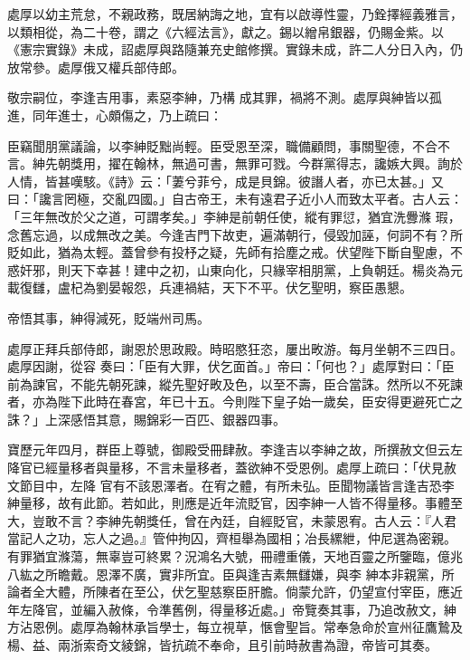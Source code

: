 \begin{pinyinscope}
 處厚以幼主荒怠，不親政務，既居納誨之地，宜有以啟導性靈，乃銓擇經義雅言，以類相從，為二十卷，謂之《六經法言》，獻之。錫以繒帛銀器，仍賜金紫。以《憲宗實錄》未成，詔處厚與路隨兼充史館修撰。實錄未成，許二人分日入內，仍放常參。處厚俄又權兵部侍郎。



 敬宗嗣位，李逢吉用事，素惡李紳，乃構
 成其罪，禍將不測。處厚與紳皆以孤進，同年進士，心頗傷之，乃上疏曰：



 臣竊聞朋黨議論，以李紳貶黜尚輕。臣受恩至深，職備顧問，事關聖德，不合不言。紳先朝獎用，擢在翰林，無過可書，無罪可戮。今群黨得志，讒嫉大興。詢於人情，皆甚嘆駭。《詩》云：「萋兮菲兮，成是貝錦。彼譖人者，亦已太甚。」又曰：「讒言罔極，交亂四國。」自古帝王，未有遠君子近小人而致太平者。古人云：「三年無改於父之道，可謂孝矣。」李紳是前朝任使，縱有罪愆，猶宜洗釁滌
 瑕，念舊忘過，以成無改之美。今逢吉門下故吏，遍滿朝行，侵毀加誣，何詞不有？所貶如此，猶為太輕。蓋曾參有投杼之疑，先師有拾塵之戒。伏望陛下斷自聖慮，不惑奸邪，則天下幸甚！建中之初，山東向化，只緣宰相朋黨，上負朝廷。楊炎為元載復讎，盧杞為劉晏報怨，兵連禍結，天下不平。伏乞聖明，察臣愚懇。



 帝悟其事，紳得減死，貶端州司馬。



 處厚正拜兵部侍郎，謝恩於思政殿。時昭愍狂恣，屢出畋游。每月坐朝不三四日。處厚因謝，從容
 奏曰：「臣有大罪，伏乞面首。」帝曰：「何也？」處厚對曰：「臣前為諫官，不能先朝死諫，縱先聖好畋及色，以至不壽，臣合當誅。然所以不死諫者，亦為陛下此時在春宮，年已十五。今則陛下皇子始一歲矣，臣安得更避死亡之誅？」上深感悟其意，賜錦彩一百匹、銀器四事。



 寶歷元年四月，群臣上尊號，御殿受冊肆赦。李逢吉以李紳之故，所撰赦文但云左降官已經量移者與量移，不言未量移者，蓋欲紳不受恩例。處厚上疏曰：「伏見赦文節目中，左降
 官有不該恩澤者。在宥之體，有所未弘。臣聞物議皆言逢吉恐李紳量移，故有此節。若如此，則應是近年流貶官，因李紳一人皆不得量移。事體至大，豈敢不言？李紳先朝獎任，曾在內廷，自經貶官，未蒙恩宥。古人云：『人君當記人之功，忘人之過。』管仲拘囚，齊桓舉為國相；冶長縲紲，仲尼選為密親。有罪猶宜滌蕩，無辜豈可終累？況鴻名大號，冊禮重儀，天地百靈之所鑒臨，億兆八紘之所瞻戴。恩澤不廣，實非所宜。臣與逢吉素無讎嫌，與李
 紳本非親黨，所論者全大體，所陳者在至公，伏乞聖慈察臣肝膽。倘蒙允許，仍望宣付宰臣，應近年左降官，並編入赦條，令準舊例，得量移近處。」帝覽奏其事，乃追改赦文，紳方沾恩例。處厚為翰林承旨學士，每立視草，愜會聖旨。常奉急命於宣州征鷹鷙及楊、益、兩浙索奇文綾錦，皆抗疏不奉命，且引前時赦書為證，帝皆可其奏。




\end{pinyinscope}
